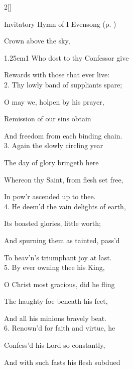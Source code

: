 \begin{paracol}{2}[]
\switchcolumn

\mattins



\begin{rubric}
	Invitatory Hymn of I Evensong  (p. \pageref{ConfessorBishopEvensong})
\end{rubric}

\mattinsOfficeHymn\label{ConfessorNotBishopMattins}

 Crown above the sky,


\begin{hangparas}{1.25em}{1}
Who dost to thy Confessor give

Rewards with those that ever live:\\

2. Thy lowly band of suppliants spare;

O may we, holpen by his prayer,

Remission of our sins obtain

And freedom from each binding chain.\\

3. Again the slowly circling year

The day of glory bringeth here

Whereon thy Saint, from flesh set free,

In pow'r ascended up to thee.\\

4. He deem'd the vain delights of earth,

Its boasted glories, little worth;

And spurning them as tainted, pass'd

To heav'n's triumphant joy at last.\\

5. By ever owning thee his King,

O Christ most gracious, did he fling

The haughty foe beneath his feet,

And all his minions bravely beat.\\

6. Renown'd for faith and virtue, he

Confess'd his Lord so constantly,

And with such fasts his flesh subdued


\end{hangparas}
\end{paracol}
